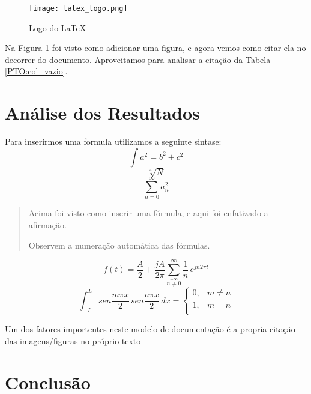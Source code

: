 \documentclass[a4paper, 12pt]{article}
\begin{document}
\begin{figure}[!h]
\centering
\texttt{[image: latex\_logo.png]}
\caption{Logo do LaTeX} \cite{lamport1994latex} %
\label{fig:Logo_latex}
\end{figure}

Na Figura \ref{fig:Logo_latex} foi visto como adicionar uma figura, e agora vemos como citar ela no decorrer do documento. Aproveitamos para analisar a citação da Tabela \ref{PTO:col_vazio}.

\section{Análise dos Resultados}

Para inserirmos uma formula utilizamos a seguinte sintase:
\begin{equation}
\int a^{2}=b^{2}+c^{2}
\label{EQ:pitagoras}
\end{equation}
\begin{equation}
\sqrt[4]{N}
\end{equation}
\begin{equation}
\sum_{n=0}^{\infty} a_{n}^{2}
\end{equation}

\begin{quote}
Acima foi visto como inserir uma fórmula, e aqui foi enfatizado a afirmação.\par Observem a numeração automática das fórmulas.
\end{quote}

\begin{equation}
f(t)= \frac{A}{2} + \frac{jA}{2 \pi }
\sum_{\stackrel{-\infty}{n
\neq 0}}^{\infty} \frac{1}{n} \, e^{jn2\pi t}
\end{equation}
\begin{equation}
\int_{-L}^{L} sen \frac{m \pi x}{2}\,sen \frac{n \pi x}{2}\,dx =
\left \{
\begin{array}{cc}
0, & m \neq n \\
1, & m = n \\
\end{array}
\right.
\end{equation}

Um dos fatores importentes neste modelo de documentação é a propria citação das imagens/figuras no próprio texto

\section{Conclusão}
\end{document}
